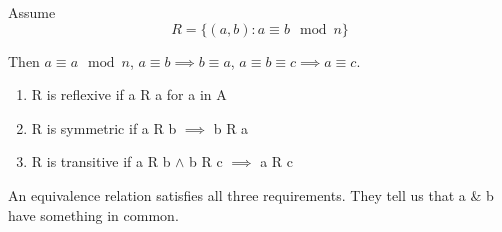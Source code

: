 \documentclass{article}
\begin{document}
Assume 
\begin{equation}
    R = \{(a,b): a \equiv b \mod n\}
\end{equation}

Then $a \equiv a \mod n$, $a \equiv b \implies b \equiv a$, $a \equiv b \equiv c \implies a \equiv c$.

\begin{enumerate}
    \item R is reflexive if a R a for a in A
    \item R is symmetric if a R b $\implies$ b R a
    \item R is transitive if a R b $\land$ b R c $\implies$ a R c
\end{enumerate}

An equivalence relation satisfies all three requirements. They tell us that a \& b have something in common. 
\end{document}
